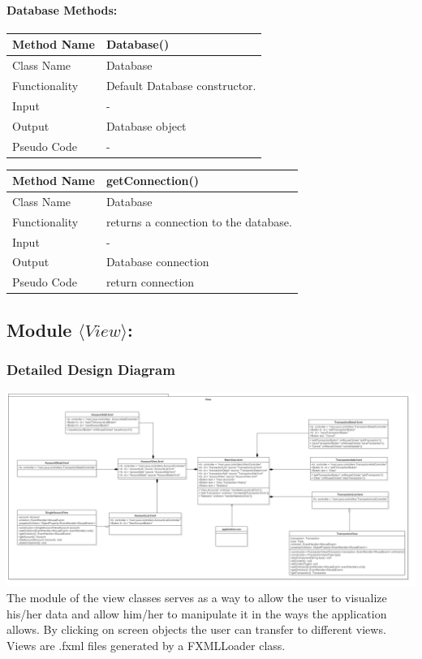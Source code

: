 \documentclass[12pt]{article}
\begin{document}
\paragraph {Database Methods:}

\begin{tabular}{ |p{3cm}||p{\colWidth}|  }
	\hline
	Method Name &  Database()\\
	\hline
	Class Name & Database\\
	\hline
	Functionality & Default Database constructor.\\
	\hline
	Input & -\\
	\hline
	Output & Database object\\
	\hline
	Pseudo Code & -\\
	\hline
\end{tabular}    

\begin{tabular}{ |p{3cm}||p{\colWidth}|  }
	\hline
	Method Name &  getConnection()\\
	\hline
	Class Name & Database\\
	\hline
	Functionality & returns a connection to the database.\\
	\hline
	Input & -\\
	\hline
	Output & Database connection\\
	\hline
	Pseudo Code & return connection\\
	\hline
\end{tabular}  

\subsection{Module $\langle View\rangle$:}
\subsubsection{Detailed Design Diagram}

\includegraphics[width=\graphicwidth]{images/View.png}
The module of the view classes serves as a way to allow the user to visualize his/her data and allow him/her to manipulate it in the ways the application allows. By clicking on screen objects the user can transfer to different views. Views are .fxml files generated by a FXMLLoader class.
\end{document}
